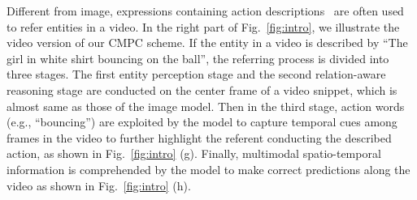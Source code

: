 \documentclass[10pt,journal,cspaper,compsoc]{IEEEtran}
\begin{document}
Different from image, expressions containing action descriptions~\cite{gavrilyuk2018actor}\cite{wang2019asymmetric} are often used to refer entities in a video. 
In the right part of Fig.~\ref{fig:intro}, we illustrate the video version of our CMPC scheme.
If the entity in a video is described by ``The girl in white shirt bouncing on the ball'', the referring process is divided into three stages. 
The first entity perception stage and the second relation-aware reasoning stage are conducted on the center frame of a video snippet, which is almost same as those of the image model.
Then in the third stage, action words (e.g., ``bouncing'') are exploited by the model to capture temporal cues among frames in the video to further highlight the referent conducting the described action, as shown in Fig.~\ref{fig:intro} (g).
Finally, multimodal spatio-temporal information is comprehended by the model to make correct predictions along the video as shown in Fig.~\ref{fig:intro} (h).
\end{document}
